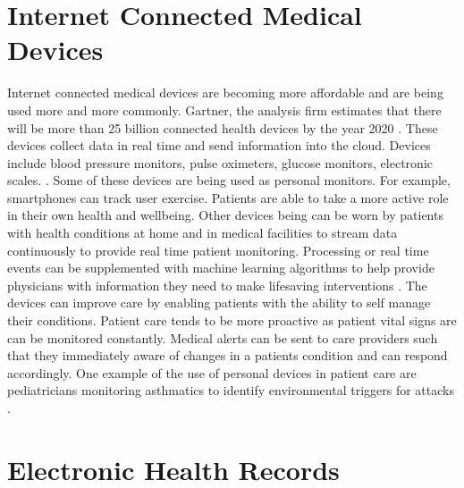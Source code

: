 \documentclass[sigconf]{acmart}
\begin{document}
\section{Internet Connected Medical Devices}
Internet connected medical devices are becoming more affordable and are being used more and more commonly.  Gartner, the analysis firm estimates that there will be more than 25 billion connected health devices by the year 2020 \cite{HlthCat}. These devices collect data in real time and send information into the cloud. Devices include blood pressure monitors, pulse oximeters, glucose monitors, electronic scales. \cite{HlthCat}.  Some of these devices are being used as personal monitors. For example, smartphones can track user exercise.  Patients are able to take a more active role in their own health and wellbeing.  Other devices being can be worn by patients with health conditions at home and in medical facilities to stream data continuously to provide real time patient monitoring.  Processing or real time events can be supplemented with machine learning algorithms to help provide physicians with information they need to make lifesaving interventions \cite{McDonald}.  The devices can improve care by enabling patients with the ability to self manage their conditions. Patient care tends to be more proactive as patient vital signs are can be monitored constantly. Medical alerts can be sent to care providers such that they immediately aware of changes in a patients condition and can respond accordingly. One example of the use of personal devices in patient care are pediatricians monitoring asthmatics to identify environmental triggers for attacks \cite{CIO}.

\section{Electronic Health Records}
\end{document}

